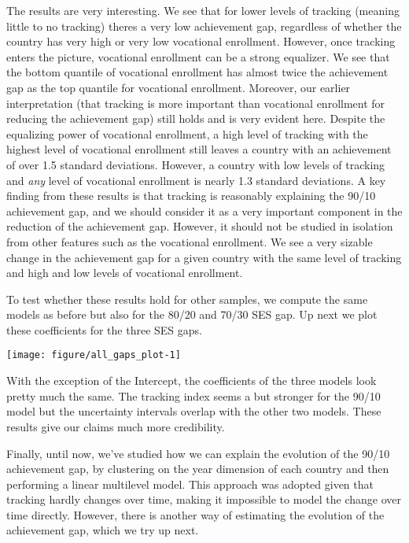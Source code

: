 \documentclass[11pt, a4paper]{article}\usepackage[]{graphicx}\usepackage[]{color}
\begin{document}
The results are very interesting. We see that for lower levels of tracking (meaning little to no tracking) theres a very low achievement gap, regardless of whether the country has very high or very low vocational enrollment. However, once tracking enters the picture, vocational enrollment can be a strong equalizer. We see that the bottom quantile of vocational enrollment has almost twice the achievement gap as the top quantile for vocational enrollment. Moreover, our earlier interpretation (that tracking is more important than vocational enrollment for reducing the achievement gap) still holds and is very evident here. Despite the equalizing power of vocational enrollment, a high level of tracking with the highest level of vocational enrollment still leaves a country with an achievement of over 1.5 standard deviations. However, a country with low levels of tracking and \textit{any} level of vocational enrollment is nearly 1.3 standard deviations. A key finding from these results is that tracking is reasonably explaining the 90/10 achievement gap, and we should consider it as a very important component in the reduction of the achievement gap. However, it should not be studied in isolation from other features such as the vocational enrollment. We see a very sizable change in the achievement gap for a given country with the same level of tracking and high and low levels of vocational enrollment.


To test whether these results hold for other samples, we compute the same models as before but also for the 80/20 and 70/30 SES gap. Up next we plot these coefficients for the three SES gaps.





{\centering \texttt{[image: figure/all\_gaps\_plot-1]} 

}




With the exception of the Intercept, the coefficients of the three models look pretty much the same. The tracking index seems a but stronger for the 90/10 model but the uncertainty intervals overlap with the other two models. These results give our claims much more credibility.

Finally, until now, we've studied how we can explain the evolution of the 90/10 achievement gap, by clustering on the year dimension of each country and then performing a linear multilevel model. This approach was adopted given that tracking hardly changes over time, making it impossible to model the change over time directly. However, there is another way of estimating the evolution of the achievement gap, which we try up next.
\end{document}
